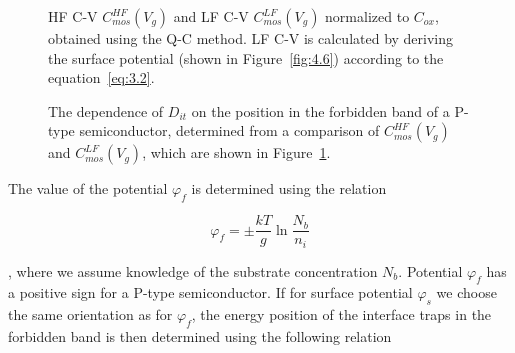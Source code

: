 \begin{figure}[h!]\centering
  \begin{minipage}[c]{\myfiguresize}
    \begin{center}
      
      \caption[HF C-V $C_{mos}^{HF} (V_{g})$ and LF C-V dependence
        $C_{mos}^{LF} (V_{g})$ normalized to $C_{ox}$, obtained using
        the Q-C method]{HF C-V $C_{mos}^{HF} (V_{g})$ and LF C-V
        $C_{mos}^{LF} (V_{g})$ normalized to $C_{ox}$, obtained using
        the Q-C method.  LF C-V is calculated by deriving the surface
        potential (shown in Figure~\ref{fig:4.6}) according to the
        equation~\ref{eq:3.2}.}\label{fig:4.7}
    \end{center}
  \end{minipage}
\end{figure}

\newpage
\begin{figure}[h!]\centering
  \begin{minipage}[c]{\myfiguresize}
    \begin{center}
      
      \caption[Dependence of $D_{it}$ on the position in the forbidden
        band of the semiconductor of a P-type semiconductor,
        determined from the comparison of $C_{mos}^{HF} (V_{g})$ and
        $C_{mos}^{LF} (V_{g})$]{The dependence of $D_{it}$ on the
        position in the forbidden band of a P-type semiconductor,
        determined from a comparison of $C_{mos}^{HF} (V_{g})$ and
        $C_{mos}^{LF} (V_{g})$, which are shown in
        Figure~\ref{fig:4.7}.}\label{fig:4.8}
    \end{center}
  \end{minipage}
\end{figure}

The value of the potential $\varphi_{f}$ is determined using the relation

\begin{equation}\label{eq:4.16}
  \varphi_{f} = \pm \frac{kT}{g} \ln{\frac{N_{b}}{n_{i}}}
\end{equation}

, where we assume knowledge of the substrate concentration
$N_{b}$. Potential $\varphi_{f}$ has a positive sign for a P-type
semiconductor. If for surface potential $\varphi_{s}$ we choose the
same orientation as for $\varphi_{f}$, the energy position of the
interface traps in the forbidden band is then determined using the
following relation

